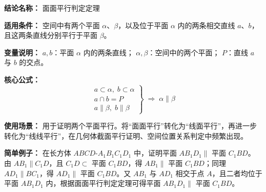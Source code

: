 \textbf{结论名称：} 面面平行判定定理

\textbf{适用条件：} 空间中有两个平面 $\alpha$、$\beta$，以及位于平面 $\alpha$ 内的两条相交直线 $a$、$b$，且这两条直线分别平行于平面 $\beta$。

\textbf{变量说明：} 
$a,b$：平面 $\alpha$ 内的两条直线； 
$\alpha,\beta$：空间中的两个平面； 
$P$：直线 $a$ 与 $b$ 的交点。

\textbf{核心公式：}
\[
\boxed{\left.\begin{array}{l}
a \subset \alpha,\; b \subset \alpha\\
a \cap b = P\\
a \parallel \beta,\; b \parallel \beta
\end{array}\right\}
\;\Longrightarrow\; \alpha \parallel \beta}
\]

\textbf{使用场景：}
用于证明两个平面平行。将“面面平行”转化为“线面平行”，再进一步转化为“线线平行”，在几何体截面平行证明、空间位置关系判定中频繁出现。

\textbf{简单例子：}
在长方体 $ABCD$-$A_1B_1C_1D_1$ 中，证明平面 $AB_1D_1 \parallel$ 平面 $C_1BD$。
由 $AB_1 \parallel C_1D$，且 $C_1D \subset$ 平面 $C_1BD$，得 $AB_1 \parallel$ 平面 $C_1BD$；同理 $AD_1 \parallel BC_1$，得 $AD_1 \parallel$ 平面 $C_1BD$。又 $AB_1$ 与 $AD_1$ 相交于点 $A$，且二者均位于平面 $AB_1D_1$ 内，根据面面平行判定定理可得平面 $AB_1D_1 \parallel$ 平面 $C_1BD$。